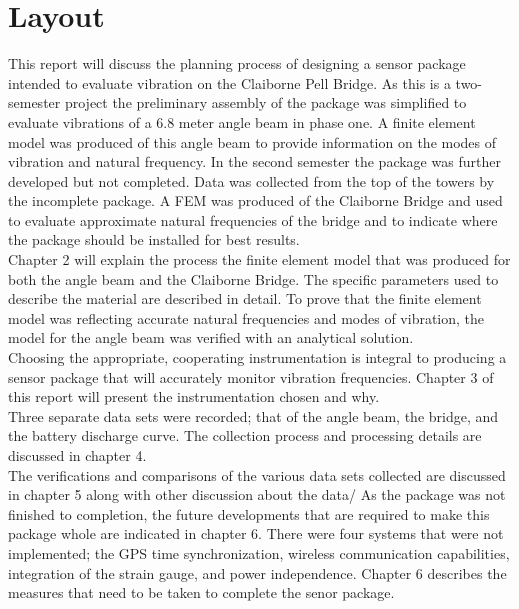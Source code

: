 \section{Layout} 

This report will discuss the planning process of designing a sensor package intended to evaluate vibration on the Claiborne Pell Bridge. As this is a
two-semester project the preliminary assembly of the package was simplified to evaluate vibrations of a 6.8 meter angle beam in phase one. A finite element
model was produced of this angle beam to provide information on the modes of vibration and natural frequency. In the second semester the package was
further developed but not completed. Data was collected from the top of the towers by the incomplete package. A FEM was produced of the Claiborne Bridge
and used to evaluate approximate natural frequencies of the bridge and to indicate where the package should be installed for best results. \\

\indent Chapter 2 will explain the process the finite element model that was produced for both the angle beam and the Claiborne Bridge. The specific
parameters  used to describe the material are described in detail. To prove that the finite element model was reflecting accurate natural frequencies and
modes of vibration, the model for the angle beam was verified with an analytical solution. \\
\indent Choosing the appropriate, cooperating instrumentation is integral to producing a sensor package that will accurately monitor vibration frequencies.
Chapter 3 of this report will present the instrumentation chosen and why. \\
\indent Three separate data sets were recorded; that of the angle beam, the bridge, and the battery discharge curve. The collection process and processing
details are discussed in chapter 4. \\ 
\indent The verifications and comparisons of the various data sets collected are discussed in chapter 5 along with other discussion about the data/ 
\indent As the package was not finished to completion, the future developments that are required to make this package whole are indicated in chapter 6.
There were four systems that were not implemented; the GPS time synchronization, wireless communication capabilities, integration of the strain gauge, and
power independence. Chapter 6 describes the measures that need to be taken to complete the senor package.\\
